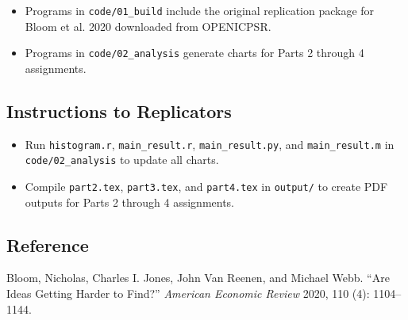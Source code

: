 \documentclass[
]{article}
\providecommand{\tightlist}{%
  \setlength{\itemsep}{0pt}\setlength{\parskip}{0pt}}
\begin{document}
\begin{itemize}
\tightlist
\item
  Programs in \texttt{code/01\_build} include the original replication package for Bloom et al. 2020 downloaded from OPENICPSR.
\item
  Programs in \texttt{code/02\_analysis} generate charts for Parts 2 through 4 assignments.
\end{itemize}

\hypertarget{instructions-to-replicators}{%
\subsection{Instructions to
Replicators}\label{instructions-to-replicators}}

\begin{itemize}
\tightlist
\item
  Run \texttt{histogram.r}, \texttt{main\_result.r}, \texttt{main\_result.py}, and \texttt{main\_result.m} in \texttt{code/02\_analysis} to update all charts.
\item
  Compile \texttt{part2.tex}, \texttt{part3.tex}, and \texttt{part4.tex} in \texttt{output/} to create PDF outputs for Parts 2 through 4 assignments.
\end{itemize}

\hypertarget{reference}{%
\subsection{Reference}\label{reference}}

Bloom, Nicholas, Charles I. Jones, John Van Reenen, and Michael Webb. ``Are Ideas Getting Harder to Find?'' \emph{American Economic Review} 2020, 110 (4): 1104–1144.
\end{document}
